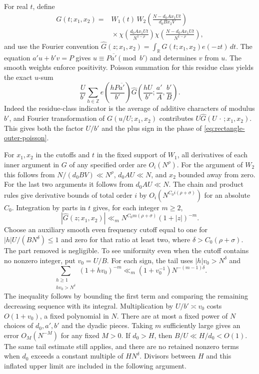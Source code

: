 \documentclass[11pt]{amsart}
\numberwithin{equation}{section}
\theoremstyle{remark}
\begin{document}
For real \(t\), define
\[
 \begin{split}
 G(t;x_1,x_2)={}&W_1(t)\,
 W_2\!\left(\frac{N-d_0 A x_1Ut}{d_0 Bx_2 V}\right)\\
 &{}\times
 \chi\!\left(\frac{d_0 A x_1Ut}{N^{1-\rho}}\right)
 \chi\!\left(\frac{N-d_0 A x_1Ut}{N^{1-\rho}}\right),
 \end{split}
\]
and use the Fourier convention
\(\widehat G(z;x_1,x_2)=\int_{\mathbb R}G(t;x_1,x_2)e(-zt)\,dt\).
The equation \(a'u+b'v=P\) gives \(u\equiv P\overline{a'}\pmod{b'}\)
and determines \(v\) from \(u\). The smooth weights enforce positivity.
Poisson summation for this residue class yields the exact \(u\)-sum
\begin{equation}\label{eq:rectangle-outer-poisson}
 \frac U{b'}\sum_{h\in\mathbb Z}
 e\!\left(\frac{hP\overline{a'}}{b'}\right)
 \widehat G\!\left(\frac{hU}{b'};\frac{a'}A,\frac{b'}B\right).
\end{equation}
Indeed the residue-class indicator is the average of additive
characters of modulus \(b'\), and Fourier transformation of
\(G(u/U;x_1,x_2)\) contributes \(U\widehat G(U\,\cdot\,;x_1,x_2)\).
This gives both the factor \(U/b'\) and the plus sign in the phase of
\eqref{eq:rectangle-outer-poisson}.

For \(x_1,x_2\) in the cutoffs and \(t\) in the fixed support of \(W_1\),
all derivatives of each inner argument in \(G\) of any specified
order are \(O_i(N^\rho)\). For the argument of \(W_2\) this follows
from \(N/(d_0 B V)\ll N^\rho\), \(d_0 A U\ll N\), and \(x_2\)
bounded away from zero. For the last two arguments it follows from
\(d_0 A U\ll N\). The chain and product rules give derivative
bounds of total order \(i\) by \(O_i(N^{C_0i(\rho+\sigma)})\)
for an absolute \(C_0\). Integration by parts in \(t\) gives, for
each integer \(m\ge2\),
\begin{equation}\label{eq:rectangle-poisson-decay}
  |\widehat G(z;x_1,x_2)|
  \ll_m N^{C_0m(\rho+\sigma)}(1+|z|)^{-m}.
\end{equation}
Choose an auxiliary smooth even frequency cutoff equal to one
for \(|h|U/(BN^\delta)\le1\) and zero for that ratio at least two,
where \(\delta>C_0(\rho+\sigma)\). The part removed is negligible.
To see uniformity even when the cutoff contains no nonzero integer,
put \(v_0=U/B\). For each sign, the tail uses
\(|h|v_0>N^\delta\) and
\[
 \sum_{\substack{h\ge1\\hv_0>N^\delta}}(1+hv_0)^{-m}
 \ll_m (1+v_0^{-1})N^{-(m-1)\delta}.
\]
The inequality follows by bounding the first term and comparing the
remaining decreasing sequence with its integral. Multiplication by
\(U/b'\asymp v_0\) costs \(O(1+v_0)\), a fixed polynomial in \(N\).
There are at most a fixed power of \(N\) choices of \(d_0,a',b'\)
and the dyadic pieces. Taking \(m\) sufficiently large gives an error
\(O_M(N^{-M})\) for any fixed \(M>0\).
If \(d_0>H\), then \(B/U\ll H/d_0< O(1)\). The same tail estimate
still applies, and there are no retained nonzero terms when
\(d_0\) exceeds a constant multiple of \(HN^\delta\).
Divisors between \(H\) and this inflated upper limit are included
in the following argument.
\end{document}
